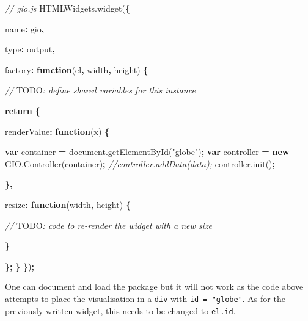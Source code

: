 \documentclass[
]{krantz}
\makeatletter
\newenvironment{Shaded}{\begin{snugshade}}{\end{snugshade}}
\newcommand{\AlertTok}[1]{\textcolor[rgb]{0.33,0.33,0.33}{#1}}
\newcommand{\AttributeTok}[1]{\textcolor[rgb]{0.61,0.61,0.61}{#1}}
\newcommand{\CommentTok}[1]{\textcolor[rgb]{0.37,0.37,0.37}{\textit{#1}}}
\newcommand{\ControlFlowTok}[1]{\textcolor[rgb]{0.27,0.27,0.27}{\textbf{#1}}}
\newcommand{\DataTypeTok}[1]{\textcolor[rgb]{0.27,0.27,0.27}{#1}}
\newcommand{\KeywordTok}[1]{\textcolor[rgb]{0.27,0.27,0.27}{\textbf{#1}}}
\newcommand{\NormalTok}[1]{#1}
\newcommand{\OperatorTok}[1]{\textcolor[rgb]{0.43,0.43,0.43}{\textbf{#1}}}
\newcommand{\StringTok}[1]{\textcolor[rgb]{0.5,0.5,0.5}{#1}}
\newcommand{\VariableTok}[1]{\textcolor[rgb]{0,0,0}{#1}}
\newenvironment{kframe}{%
\medskip{}
\setlength{\fboxsep}{.8em}
 \def\at@end@of@kframe{}%
 \ifinner\ifhmode%
  \def\at@end@of@kframe{\end{minipage}}%
  \begin{minipage}{\columnwidth}%
 \fi\fi%
 \def\FrameCommand##1{\hskip\@totalleftmargin \hskip-\fboxsep
 \colorbox{shadecolor}{##1}\hskip-\fboxsep
     \hskip-\linewidth \hskip-\@totalleftmargin \hskip\columnwidth}%
 \MakeFramed {\advance\hsize-\width
   \@totalleftmargin\z@ \linewidth\hsize
   \@setminipage}}%
 {\par\unskip\endMakeFramed%
 \at@end@of@kframe}
\renewenvironment{Shaded}{\begin{kframe}}{\end{kframe}}
\makeatother
\begin{document}
\begin{Shaded}
\begin{Highlighting}[]
\CommentTok{// gio.js}
\VariableTok{HTMLWidgets}\NormalTok{.}\AttributeTok{widget}\NormalTok{(}\OperatorTok{\{}

  \DataTypeTok{name}\OperatorTok{:} \StringTok{\textquotesingle{}gio\textquotesingle{}}\OperatorTok{,}

  \DataTypeTok{type}\OperatorTok{:} \StringTok{\textquotesingle{}output\textquotesingle{}}\OperatorTok{,}

  \DataTypeTok{factory}\OperatorTok{:} \KeywordTok{function}\NormalTok{(el}\OperatorTok{,}\NormalTok{ width}\OperatorTok{,}\NormalTok{ height) }\OperatorTok{\{}

    \CommentTok{// }\AlertTok{TODO}\CommentTok{: define shared variables for this instance}

    \ControlFlowTok{return} \OperatorTok{\{}

      \DataTypeTok{renderValue}\OperatorTok{:} \KeywordTok{function}\NormalTok{(x) }\OperatorTok{\{}

        \KeywordTok{var}\NormalTok{ container }\OperatorTok{=} \VariableTok{document}\NormalTok{.}\AttributeTok{getElementById}\NormalTok{(}\StringTok{"globe"}\NormalTok{)}\OperatorTok{;}
        \KeywordTok{var}\NormalTok{ controller }\OperatorTok{=} \KeywordTok{new} \VariableTok{GIO}\NormalTok{.}\AttributeTok{Controller}\NormalTok{(container)}\OperatorTok{;}
        \CommentTok{//controller.addData(data);}
        \VariableTok{controller}\NormalTok{.}\AttributeTok{init}\NormalTok{()}\OperatorTok{;}

      \OperatorTok{\},}

      \DataTypeTok{resize}\OperatorTok{:} \KeywordTok{function}\NormalTok{(width}\OperatorTok{,}\NormalTok{ height) }\OperatorTok{\{}

        \CommentTok{// }\AlertTok{TODO}\CommentTok{: code to re{-}render the widget with a new size}

      \OperatorTok{\}}

    \OperatorTok{\};}
  \OperatorTok{\}}
\OperatorTok{\}}\NormalTok{)}\OperatorTok{;}
\end{Highlighting}
\end{Shaded}

One can document and load the package but it will not work as the code above attempts to place the visualisation in a \texttt{div} with \texttt{id\ =\ "globe"}. As for the previously written widget, this needs to be changed to \texttt{el.id}.
\end{document}
